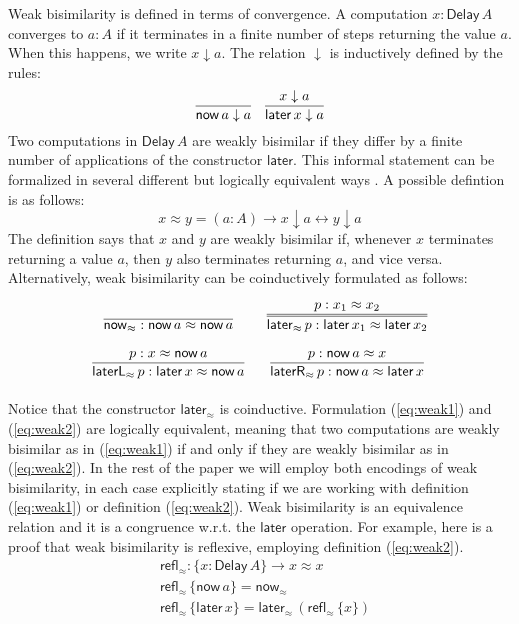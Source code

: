 \documentclass[runningheads]{llncs}
\newcommand{\Delay}{\mathsf{Delay}\,}
\newcommand{\now}{\mathsf{now}}
\newcommand{\later}{\mathsf{later}}
\newcommand{\laterR}{\mathsf{laterR}}
\newcommand{\laterL}{\mathsf{laterL}}
\newcommand{\dn}{\downarrow}
\newcommand{\refl}{\mathsf{refl}}
\begin{document}
Weak bisimilarity is defined in terms of convergence. A computation
$x : \Delay A$ converges to $a : A$ if it terminates in a finite
number of steps returning the value $a$. When this happens, we write
$x \dn a$. The relation $\dn$ is inductively defined by the rules:
\[
\infer{\now\,a \dn a}{}
\quad
\infer{\later\,x \dn a}{x \dn a}
\]
Two computations in $\Delay A$ are weakly bisimilar if they differ by
a finite number of applications of the constructor $\later$. This
informal statement can be formalized in several different but
logically equivalent ways \cite{ChapmanUV19}. 
A possible defintion is as follows:
\begin{equation}\label{eq:weak1}
x \approx y = (a : A) \to x \dn a \leftrightarrow y \dn a
\end{equation}
The definition says that $x$ and $y$ are weakly bisimilar if, whenever
$x$ terminates returning a value $a$, then $y$ also terminates
returning $a$, and vice versa.
Alternatively, weak bisimilarity can be coinductively formulated as follows:
\begin{equation}
\label{eq:weak2}
\arraycolsep=8pt\def\arraystretch{2.8}
\begin{array}{cc}
\infer{\now_{\approx}  : \now\,a \approx \now\,a}{}
&
\infer={\later_{\approx} \,p : \later\,x_1 \approx \later\,x_2}{p : x_1 \approx x_2}
\\
\infer{\laterL_{\approx} \, p: \later\,x \approx \now\,a}{p : x \approx \now \,a}
&
\infer{\laterR_{\approx} \, p: \now\,a \approx \later\,x}{p : \now\,a \approx x}
\end{array}
\end{equation}
Notice that the constructor $\later_{\approx}$ is
coinductive. Formulation (\ref{eq:weak1}) and (\ref{eq:weak2}) are
logically equivalent, meaning that two computations are weakly
bisimilar as in (\ref{eq:weak1}) if and only if they are weakly
bisimilar as in (\ref{eq:weak2}).
In the rest of the paper we will employ
both encodings of weak bisimilarity, in each case explicitly stating
if we are working with definition (\ref{eq:weak1}) or definition (\ref{eq:weak2}).
Weak bisimilarity is an equivalence
relation and it is a congruence w.r.t. the $\later$ operation.
For example, here is a proof that weak bisimilarity is reflexive,
employing definition (\ref{eq:weak2}).
\begin{align*}
& \refl_{\approx} : \{x : \Delay A\} \to x \approx x \\
& \refl_{\approx} \,\{\now\,a\} = \now_\approx \\
& \refl_{\approx} \,\{\later\,x\} = \later_\approx\,(\refl_\approx \,\{x\})
\end{align*}
\end{document}
